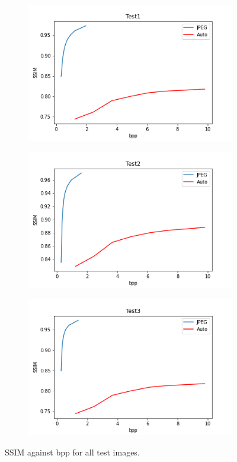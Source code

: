 \documentclass{article}
\begin{document}
\begin{figure}
    \centering
    \begin{subfigure}[b]{0.7 \textwidth}
    \includegraphics[width=\textwidth]{Images/Plots/test1_SSIM.png}
    \end{subfigure}
    \begin{subfigure}[b]{0.7 \textwidth}
    \includegraphics[width=\textwidth]{Images/Plots/test2_SSIM.png}
    \end{subfigure}
    \begin{subfigure}[b]{0.7 \textwidth}
    \includegraphics[width=\textwidth]{Images/Plots/test3_SSIM.png}
    \end{subfigure}
    \caption{SSIM against bpp for all test images.}
    \label{fig:objective_SSIM}
\end{figure}
\end{document}
